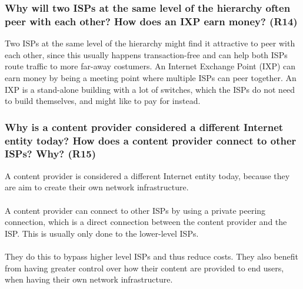\subsubsection{Why will two ISPs at the same level of the hierarchy often peer with each other? How does an IXP earn money? (R14)}

Two ISPs at the same level of the hierarchy might find it attractive to peer with each other, since this usually happens transaction-free and can help both ISPs route traffic to more far-away costumers. An Internet Exchange Point (IXP) can earn money by being a meeting point where multiple ISPs can peer together. An IXP is a stand-alone building with a lot of switches, which the ISPs do not need to build themselves, and might like to pay for instead. 

\subsubsection{Why is a content provider considered a different Internet entity today? How does a content provider connect to other ISPs? Why? (R15)}

A content provider is considered a different Internet entity today, because they are aim to create their own network infrastructure.\\ 
\\
A content provider can connect to other ISPs by using a private peering connection, which is a direct connection between the content provider and the ISP. This is usually only done to the lower-level ISPs.\\
\\
They do this to bypass higher level ISPs and thus reduce costs. They also benefit from having greater control over how their content are provided to end users, when having their own network infrastructure. \\
\\
